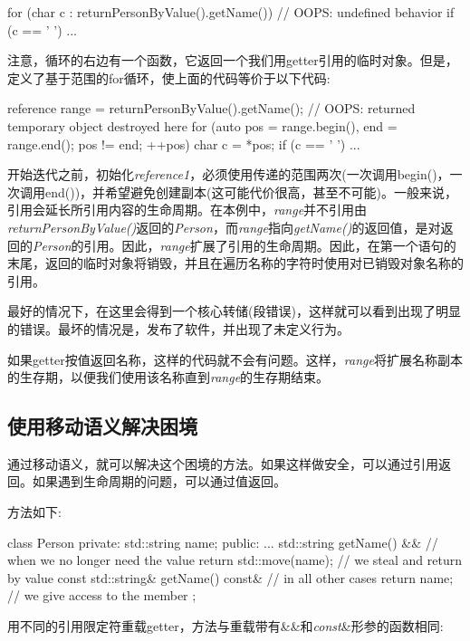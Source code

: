 \begin{cppcode}
for (char c : returnPersonByValue().getName()) { // OOPS: undefined behavior
	if (c == ' ') {
		...
	}
}
\end{cppcode}

注意，循环的右边有一个函数，它返回一个我们用getter引用的临时对象。但是，定义了基于范围的for循环，使上面的代码等价于以下代码:

\begin{cppcode}
reference range = returnPersonByValue().getName();
// OOPS: returned temporary object destroyed here
for (auto pos = range.begin(), end = range.end(); pos != end; ++pos) {
	char c = *pos;
	if (c == ' ') {
		...
	}
}
\end{cppcode}

开始迭代之前，初始化\textit{reference1}，必须使用传递的范围两次(一次调用begin()，一次调用end())，并希望避免创建副本(这可能代价很高，甚至不可能)。一般来说，引用会延长所引用内容的生命周期。在本例中，\textit{range}并不引用由\textit{returnPersonByValue()}返回的\textit{Person}，而\textit{range}指向\textit{getName()}的返回值，是对返回的\textit{Person}的引用。因此，\textit{range}扩展了引用的生命周期。因此，在第一个语句的末尾，返回的临时对象将销毁，并且在遍历名称的字符时使用对已销毁对象名称的引用。

最好的情况下，在这里会得到一个核心转储(段错误)，这样就可以看到出现了明显的错误。最坏的情况是，发布了软件，并出现了未定义行为。

如果getter按值返回名称，这样的代码就不会有问题。这样，\textit{range}将扩展名称副本的生存期，以便我们使用该名称直到\textit{range}的生存期结束。

\subsection{使用移动语义解决困境}

通过移动语义，就可以解决这个困境的方法。如果这样做安全，可以通过引用返回。如果遇到生命周期的问题，可以通过值返回。

方法如下:

\begin{cppcode}
class Person
{
private:
	std::string name;
public:
	...
	std::string getName() && { // when we no longer need the value
		return std::move(name); // we steal and return by value
	}
	const std::string& getName() const& { // in all other cases
		return name; // we give access to the member
	}
};
\end{cppcode}

用不同的引用限定符重载getter，方法与重载带有\&\&和\textit{const}\&形参的函数相同:

